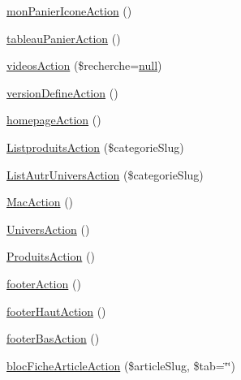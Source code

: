 \begin{DoxyCompactItemize}
\item 
\hyperlink{class_acme_group_1_1_site_bundle_1_1_controller_1_1_site_controller_a64c001d3fa483f8ed84b49c4a01a6f27}{mon\+Panier\+Icone\+Action} ()
\item 
\hyperlink{class_acme_group_1_1_site_bundle_1_1_controller_1_1_site_controller_abb6596e602ea262e5afc41db2aa15cb8}{tableau\+Panier\+Action} ()
\item 
\hyperlink{class_acme_group_1_1_site_bundle_1_1_controller_1_1_site_controller_ae43d19c8e5c0c06932455091f5ecc670}{videos\+Action} (\$recherche=\hyperlink{validate_8js_afb8e110345c45e74478894341ab6b28e}{null})
\item 
\hyperlink{class_acme_group_1_1_site_bundle_1_1_controller_1_1_site_controller_abf0a1d8dedd122d41b49d3d729d81443}{version\+Define\+Action} ()
\item 
\hyperlink{class_acme_group_1_1_site_bundle_1_1_controller_1_1_site_controller_a7ccdc7491a6d9fdf06f672f8cfb3d024}{homepage\+Action} ()
\item 
\hyperlink{class_acme_group_1_1_site_bundle_1_1_controller_1_1_site_controller_a8652356bd6724c6383ec070e73bbc0bd}{Listproduits\+Action} (\$categorie\+Slug)
\item 
\hyperlink{class_acme_group_1_1_site_bundle_1_1_controller_1_1_site_controller_aa236df5fe99b17f246b8abfeb6f6df51}{List\+Autr\+Univers\+Action} (\$categorie\+Slug)
\item 
\hyperlink{class_acme_group_1_1_site_bundle_1_1_controller_1_1_site_controller_a2fa41aa7b73bf9f6d75155f9a1073f34}{Mac\+Action} ()
\item 
\hyperlink{class_acme_group_1_1_site_bundle_1_1_controller_1_1_site_controller_aef8aef14e82f846c07c0e28b26ebc448}{Univers\+Action} ()
\item 
\hyperlink{class_acme_group_1_1_site_bundle_1_1_controller_1_1_site_controller_a3e07a0ada523428a447dd9381af283c7}{Produits\+Action} ()
\item 
\hyperlink{class_acme_group_1_1_site_bundle_1_1_controller_1_1_site_controller_a43c6ff73b2930ef06baa97e17ac90763}{footer\+Action} ()
\item 
\hyperlink{class_acme_group_1_1_site_bundle_1_1_controller_1_1_site_controller_a8bcbbda3bc86a02d70cd0485bd7ad16d}{footer\+Haut\+Action} ()
\item 
\hyperlink{class_acme_group_1_1_site_bundle_1_1_controller_1_1_site_controller_a4ee174a67df76d9e59ddaa291d0af595}{footer\+Bas\+Action} ()
\item 
\hyperlink{class_acme_group_1_1_site_bundle_1_1_controller_1_1_site_controller_a7b8c5c4a5c836a4d95a9d95ddf5e3d04}{bloc\+Fiche\+Article\+Action} (\$article\+Slug, \$tab=\char`\"{}\char`\"{})

\end{DoxyCompactItemize}
